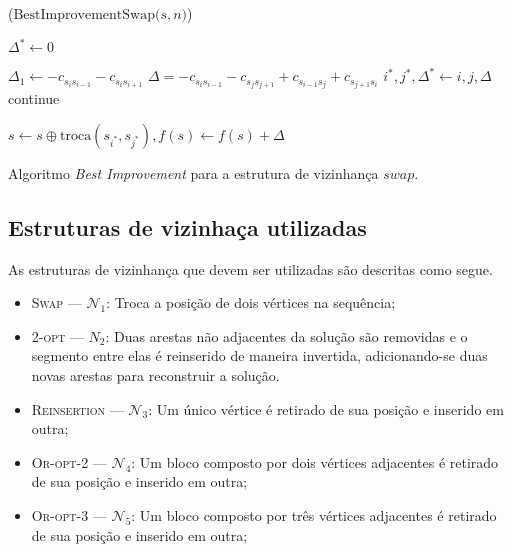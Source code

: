 \begin{algorithm}
\DontPrintSemicolon
{}
\Begin($\text{BestImprovementSwap} {(} s,n {)}$)
{
    $\Delta^* \gets 0$\; \label{algBestSwapIniciaDelta}
  {
    $\Delta_1 \gets -c_{s_i s_{i-1}} - c_{s_i s_{i+1}}$ \;
    {
        {
             $\Delta = -c_{s_i s_{i-1}} -c_{s_j s_{j+1}} + c_{s_{i-1} s_{j}} + c_{s_{j+1} s_i}$\;
            \lIf{$\Delta < \Delta^*$}
            {
                $i^*, j^*, \Delta^* \gets i,j,\Delta$ 
            }
        continue
        }
    }
   
  }\label{endfor}
  {
    \(s \gets s \oplus \text{troca}(s_{i^*}, s_{j^*}), f(s) \gets f(s) + \Delta\)
  }
}
\caption{Algoritmo \textit{Best Improvement} para a estrutura de vizinhança \(swap\).}\label{alg:swapBestImprovement}
\end{algorithm}
\fi

\subsection{Estruturas de vizinhaça utilizadas}

As estruturas de vizinhança que devem ser utilizadas são descritas como segue.

\begin{itemize}
    \item \textsc{Swap} --- \(\mathcal{N}_1\): Troca a posição de dois vértices na sequência;
    \item \textsc{2-opt} --- \(N_2\): Duas arestas não adjacentes da solução são removidas e o segmento entre elas é reinserido de maneira invertida, adicionando-se duas novas arestas para reconstruir a solução.
    \item \textsc{Reinsertion} --- \(\mathcal{N}_3\): Um único vértice é retirado de sua posição e inserido em outra;
     \item \textsc{Or-opt-2} --- \(\mathcal{N}_4\): Um bloco composto por dois vértices adjacentes é retirado de sua posição e inserido em outra;
     \item \textsc{Or-opt-3} --- \(\mathcal{N}_5\): Um bloco composto por três vértices adjacentes é retirado de sua posição e inserido em outra;
\end{itemize}

